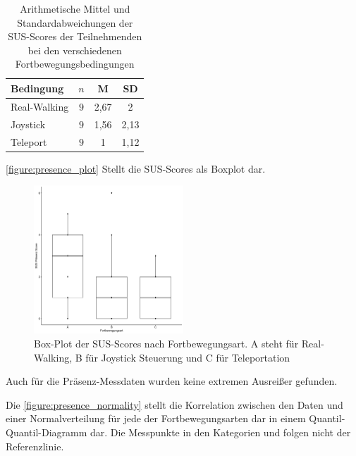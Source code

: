                     \begin{table}[!h]
                        \renewcommand\arraystretch{1.2}
                        \centering
                        \begin{tabular}{lccc} \toprule
                            Bedingung       & $n$ & M       & SD     \\ \midrule
                            Real-Walking    & $9$ & 2,67 & 2  \\
                            Joystick        & $9$ & 1,56 & 2,13  \\
                            Teleport        & $9$ & 1    & 1,12 \\ \bottomrule
                        \end{tabular}
                        \caption{Arithmetische Mittel und Standardabweichungen der SUS-Scores der Teilnehmenden bei den verschiedenen Fortbewegungsbedingungen} \label{table:presence_means}
                    \end{table}

                    \autoref{figure:presence_plot} Stellt die SUS-Scores als Boxplot dar.

                    \begin{figure}[!h]
                        \centering
                        \includegraphics[width=0.5\textwidth]{plots/presence_plot.png}
                        \caption{Box-Plot der SUS-Scores nach Fortbewegungsart. A steht für Real-Walking, B für Joystick Steuerung und C für Teleportation}\label{figure:presence_plot}
                    \end{figure}

                    Auch für die Präsenz-Messdaten wurden keine extremen Ausreißer gefunden.

                    Die \autoref{figure:presence_normality} stellt die Korrelation zwischen den Daten und einer Normalverteilung für jede der Fortbewegungsarten dar in einem Quantil-Quantil-Diagramm dar.
                    Die Messpunkte in den Kategorien  und  folgen nicht der Referenzlinie.

